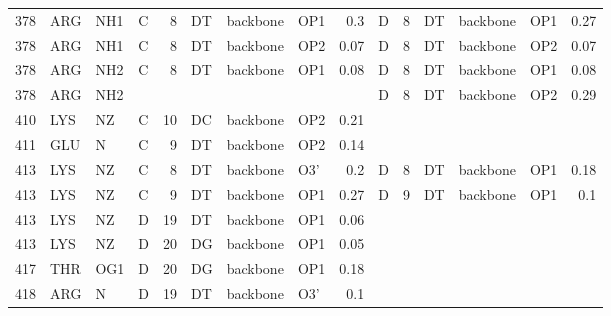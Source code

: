 \begin{longtable}{rlllrlllrlrlllr}
       378 & ARG        & NH1    & C         &           8 & DT           & backbone    & OP1      &          0.3  & D         &           8 & DT           & backbone    & OP1      &          0.27 \\
       378 & ARG        & NH1    & C         &           8 & DT           & backbone    & OP2      &          0.07 & D         &           8 & DT           & backbone    & OP2      &          0.07 \\
       378 & ARG        & NH2    & C         &           8 & DT           & backbone    & OP1      &          0.08 & D         &           8 & DT           & backbone    & OP1      &          0.08 \\
       378 & ARG        & NH2    &        &          &           &          &       &            & D         &           8 & DT           & backbone    & OP2      &          0.29 \\
       410 & LYS        & NZ     & C         &          10 & DC           & backbone    & OP2      &          0.21 &        &          &           &          &       &            \\
       411 & GLU        & N      & C         &           9 & DT           & backbone    & OP2      &          0.14 &        &          &           &          &       &            \\
       413 & LYS        & NZ     & C         &           8 & DT           & backbone    & O3'      &          0.2  & D         &           8 & DT           & backbone    & OP1      &          0.18 \\
       413 & LYS        & NZ     & C         &           9 & DT           & backbone    & OP1      &          0.27 & D         &           9 & DT           & backbone    & OP1      &          0.1  \\
       413 & LYS        & NZ     & D         &          19 & DT           & backbone    & OP1      &          0.06 &        &          &           &          &       &            \\
       413 & LYS        & NZ     & D         &          20 & DG           & backbone    & OP1      &          0.05 &        &          &           &          &       &            \\
       417 & THR        & OG1    & D         &          20 & DG           & backbone    & OP1      &          0.18 &        &          &           &          &       &            \\
       418 & ARG        & N      & D         &          19 & DT           & backbone    & O3'      &          0.1  &        &          &           &          &       &            \\

\end{longtable}
